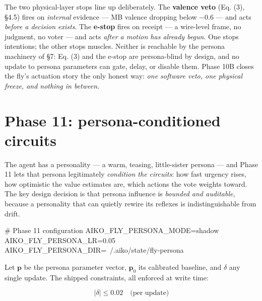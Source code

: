 \documentclass[11pt]{article}
\begin{document}

The two physical-layer stops line up deliberately. The \textbf{valence veto} (Eq. (3), §4.5) fires on \emph{internal} evidence — MB valence dropping below −0.6 — and acts \emph{before a decision exists}. The \textbf{e-stop} fires on receipt — a wire-level frame, no judgment, no voter — and acts \emph{after a motion has already begun}. One stops intentions; the other stops muscles. Neither is reachable by the persona machinery of §7: Eq. (3) and the e-stop are persona-blind by design, and no update to persona parameters can gate, delay, or disable them. Phase 10B closes the fly's actuation story the only honest way: \emph{one software veto, one physical freeze, and nothing in between.}

\section{Phase 11: persona-conditioned circuits}

The agent has a personality — a warm, teasing, little-sister persona — and Phase 11 lets that persona legitimately \emph{condition the circuits}: how fast urgency rises, how optimistic the value estimates are, which actions the vote weights toward. The key design decision is that persona influence is \emph{bounded and auditable}, because a personality that can quietly rewire its reflexes is indistinguishable from drift.

\begin{CodeBlock}
# Phase 11 configuration
AIKO_FLY_PERSONA_MODE=shadow
AIKO_FLY_PERSONA_LR=0.05
AIKO_FLY_PERSONA_DIR=~/.aiko/state/fly-persona
\end{CodeBlock}

Let \(\mathbf{p}\) be the persona parameter vector, \(\mathbf{p}_0\) its calibrated baseline, and \(\delta\) any single update. The shipped constraints, all enforced at write time:

\begin{equation}
|\delta| \le 0.02 \quad\text{(per update)}
\tag{10a}
\end{equation}
\end{document}
